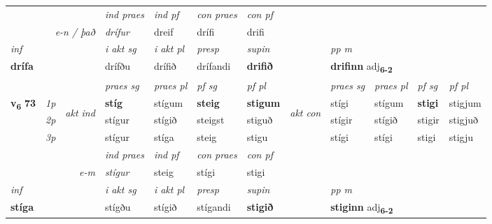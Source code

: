 \begin{longtable}[l]{X>{\footnotesize\itshape}llXXXXlXXXX}
   && &  \textit{ind praes} & \textit{ind pf} & \textit{con praes} & \textit{con pf} \\*
\multicolumn{3}{r}{\textit{e-n / það}} & drífur & dreif & drífi & drifi \\*

\cmidrule{4-7}
   {\textit{inf}} & &  & \textit{i akt sg} & \textit{i akt pl}   & \textit{presp} & \textit{supin}  && \textit{pp m} \\*
  {\textbf{drífa}} & && drífðu  & drífið   & drífandi &  \textbf{drifið}  && \multicolumn{2}{l}{\textbf{drifinn} adj\textbf{\textsubscript{6-2}}} \\*

\midrule

 & &   & \textit{praes sg}  & \textit{praes pl}    & \textit{ pf sg} & \textit{pf pl} & & \textit{praes sg}  & \textit{praes pl}    & \textit{pf sg} & \textit{pf pl }  \\ \cmidrule{4-7} \cmidrule{9-12}
 \multirow{2}{*}{{{\textbf{v{\textsubscript{6}}} \Large{\textbf{73}}}}}  & 1p & \multirow{3}{*}{\begin{turn}{90}\textit{akt ind}\end{turn}} & \textbf{stíg} & stígum & \textbf{steig} & \textbf{stigum} & \multirow{3}{*}{\begin{turn}{90}\textit{akt con}\end{turn}} &stígi & stígum & \textbf{stigi} & stigjum\\*
 & 2p &  &  stígur  & stígið & steigst & stiguð & & stígir & stígið & stigir & stigjuð \\*
 & 3p &  & stígur & stíga & steig & stigu & & stígi & stígi& stigi & stigju \\*
\cmidrule{4-7} \cmidrule{9-12}

   && &  \textit{ind praes} & \textit{ind pf} & \textit{con praes} & \textit{con pf} \\*
\multicolumn{3}{r}{\textit{e-m}} & stígur & steig & stígi & stigi \\*

\cmidrule{4-7}
   {\textit{inf}} & &  & \textit{i akt sg} & \textit{i akt pl}   & \textit{presp} & \textit{supin}  && \textit{pp m} \\*
  {\textbf{stíga}} & && stígðu  & stígið   & stígandi &  \textbf{stigið}  && \multicolumn{2}{l}{\textbf{stiginn} adj\textbf{\textsubscript{6-2}}} \\*

\midrule


\end{longtable}
